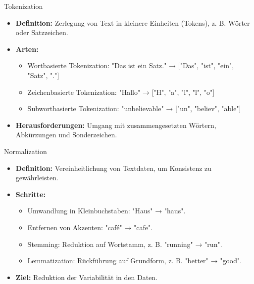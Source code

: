 \documentclass[aspectratio=1610, xcolor=dvipsnames, 9pt]{beamer}
\begin{document}
\begin{frame}{Tokenization}
  \begin{itemize}
    \item \textbf{Definition:} Zerlegung von Text in kleinere Einheiten (Tokens), z. B. Wörter oder Satzzeichen.
    \vspace{0.5cm}
    \item \textbf{Arten:}
      \begin{itemize}
        \item Wortbasierte Tokenization: "Das ist ein Satz." → ["Das", "ist", "ein", "Satz", "."]
        \item Zeichenbasierte Tokenization: "Hallo" → ["H", "a", "l", "l", "o"]
        \item Subwortbasierte Tokenization: "unbelievable" → ["un", "believ", "able"]
      \end{itemize}
      \vspace{0.5cm}
    \item \textbf{Herausforderungen:} Umgang mit zusammengesetzten Wörtern, Abkürzungen und Sonderzeichen.
  \end{itemize}
\end{frame}

\begin{frame}{Normalization}
  \begin{itemize}
    \item \textbf{Definition:} Vereinheitlichung von Textdaten, um Konsistenz zu gewährleisten.
    \vspace{0.5cm}
    \item \textbf{Schritte:}
      \begin{itemize}
        \item Umwandlung in Kleinbuchstaben: "Haus" → "haus".
        \item Entfernen von Akzenten: "café" → "cafe".
        \item Stemming: Reduktion auf Wortstamm, z. B. "running" → "run".
        \item Lemmatization: Rückführung auf Grundform, z. B. "better" → "good".
      \end{itemize}
      \vspace{0.5cm}
    \item \textbf{Ziel:} Reduktion der Variabilität in den Daten.
  \end{itemize}
\end{frame}
\end{document}
